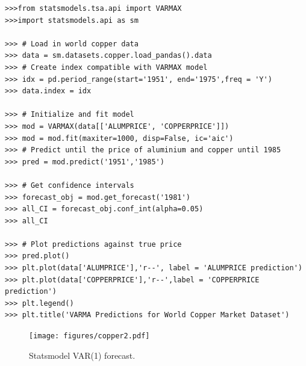 \begin{lstlisting}
>>>from statsmodels.tsa.api import VARMAX
>>>import statsmodels.api as sm

>>> # Load in world copper data
>>> data = sm.datasets.copper.load_pandas().data
>>> # Create index compatible with VARMAX model
>>> idx = pd.period_range(start='1951', end='1975',freq = 'Y')
>>> data.index = idx

>>> # Initialize and fit model
>>> mod = VARMAX(data[['ALUMPRICE', 'COPPERPRICE']])
>>> mod = mod.fit(maxiter=1000, disp=False, ic='aic')
>>> # Predict until the price of aluminium and copper until 1985
>>> pred = mod.predict('1951','1985')

>>> # Get confidence intervals
>>> forecast_obj = mod.get_forecast('1981')
>>> all_CI = forecast_obj.conf_int(alpha=0.05)
>>> all_CI

>>> # Plot predictions against true price
>>> pred.plot()
>>> plt.plot(data['ALUMPRICE'],'r--', label = 'ALUMPRICE prediction')
>>> plt.plot(data['COPPERPRICE'],'r--',label = 'COPPERPRICE prediction')
>>> plt.legend()
>>> plt.title('VARMA Predictions for World Copper Market Dataset')
\end{lstlisting}

\begin{figure}[H]
\centering
\texttt{[image: figures/copper2.pdf]}
\caption{Statsmodel VAR(1) forecast.}
\label{fig:varma}
\end{figure}

